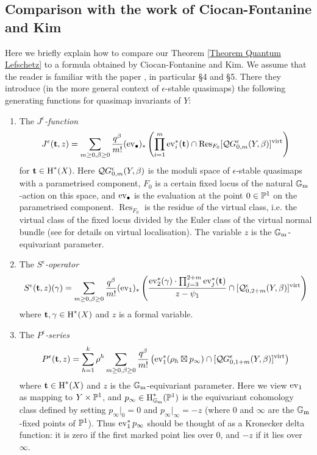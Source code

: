 \subsection{Comparison with the work of Ciocan-Fontanine and Kim}
Here we briefly explain how to compare our Theorem \ref{Theorem Quantum Lefschetz} to a formula obtained by Ciocan-Fontanine and Kim. We assume that the reader is familiar with the paper \cite{CF-K-wallcrossing}, in particular \S4 and \S5. There they introduce (in the more general context of $\epsilon$-stable quasimaps) the following generating functions for quasimap invariants of $Y$:
\begin{enumerate}
\item The \emph{$J^{\epsilon}$-function}
\begin{equation*} J^\epsilon({\bf t}, z)=\sum_{m\geq 0,\beta\geq 0} \dfrac{q^\beta}{m!} (\operatorname{ev}_\bullet)_*\left( \prod_{i=1}^m \operatorname{ev}_i^*({\bf t}) \cap\operatorname{Res}_{F_0} [\mathcal{Q}G^{\epsilon}_{0,m}(Y,\beta)]^{\operatorname{virt}} \right) \end{equation*}
for $\mathbf{t} \in \operatorname{H}^*(X)$. Here $\mathcal{Q}G^{\epsilon}_{0,m}(Y,\beta)$ is the moduli space of $\epsilon$-stable  quasimaps with a parametrised component, $F_0$ is a certain fixed locus of the natural $\mathbb{G}_{\text{m}}$-action on this space, and $\operatorname{ev}_\bullet$ is the evaluation at the point $0 \in \mathbb P^1$ on the parametrised component. $\operatorname{Res}_{F_0}$ is the residue of the virtual class, i.e. the virtual class of the fixed locus divided by the Euler class of the virtual normal bundle (see \cite{GraberPandharipande} for details on virtual localisation). The variable $z$ is the $\mathbb{G}_{\text{m}}$-equivariant parameter.
\item The \emph{$S^\epsilon$-operator}
\begin{equation*}
 S^\epsilon(\mathbf{t},z)(\gamma)=\sum_{m\ge 0,\beta\ge 0}\frac{q^\beta}{m!} 
(\operatorname{ev}_1)_*\left( \dfrac{\operatorname{ev}_2^*(\gamma) \cdot \prod_{j=3}^{2+m} \operatorname{ev}_j^*({\bf t})}{z-\psi_1} \cap[\mathcal{Q}^{\epsilon}_{0,2+m}(Y,\beta)]^{\operatorname{virt}} \right)
\end{equation*}
where $\mathbf{t}, \gamma \in \operatorname{H}^*(X)$ and $z$ is a formal variable.
\item The \emph{$P^\epsilon$-series}
\begin{equation*}
 P^\epsilon({\bf t}, z)=\sum_{h=1}^k \rho^h \sum_{m\geq 0,\beta\geq 0} \frac{q^\beta }{m!} \left( \operatorname{ev}_1^*(\rho_h \boxtimes p_\infty) \cap [\mathcal{Q}G^{\epsilon}_{0,1+m}(Y,\beta)]^{\operatorname{virt}} \right) \end{equation*}
where $\mathbf{t} \in \operatorname{H}^*(X)$ and $z$ is the $\mathbb{G}_{\text{m}}$-equivariant parameter. Here we view $\operatorname{ev}_1$ as mapping to $Y \times \mathbb P^1$, and $p_\infty\in \operatorname{H}^*_{\mathbb{G}_{\text{m}}}(\mathbb P^1)$ is the equivariant cohomology class defined by setting $p_{\infty}|_0 =0$ and $p_{\infty}|_{\infty}=-z$ (where $0$ and $\infty$ are the $\mathbb{G}_{\text{m}}$-fixed points of $\mathbb P^1$). Thus $\operatorname{ev}_1^* p_\infty$ should be thought of as a Kronecker delta function: it is zero if the first marked point lies over $0$, and $-z$ if it lies over $\infty$.
\end{enumerate}
